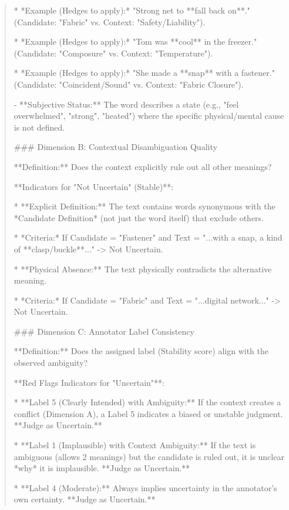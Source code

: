 \begin{quote}
    *   *Example (Hedges to apply):* "Strong net to **fall back on**." (Candidate: "Fabric" vs. Context: "Safety/Liability").

    *   *Example (Hedges to apply):* "Tom was **cool** in the freezer." (Candidate: "Composure" vs. Context: "Temperature").

    *   *Example (Hedges to apply):* "She made a **snap** with a fastener." (Candidate: "Coincident/Sound" vs. Context: "Fabric Closure").

- **Subjective Status:** The word describes a state (e.g., "feel overwhelmed", "strong", "heated") where the specific physical/mental cause is not defined.



### Dimension B: Contextual Disambiguation Quality

**Definition:** Does the context explicitly rule out all other meanings?

**Indicators for "Not Uncertain" (Stable)**:

*   **Explicit Definition:** The text contains words synonymous with the *Candidate Definition* (not just the word itself) that exclude others.

    *   *Criteria:* If Candidate = "Fastener" and Text = "...with a snap, a kind of **clasp/buckle**..." -> Not Uncertain.

*   **Physical Absence:** The text physically contradicts the alternative meaning.

    *   *Criteria:* If Candidate = "Fabric" and Text = "...digital network..." -> Not Uncertain.



### Dimension C: Annotator Label Consistency

**Definition:** Does the assigned label (Stability score) align with the observed ambiguity?

**Red Flags Indicators for "Uncertain"**:

*   **Label 5 (Clearly Intended) with Ambiguity:** If the context creates a conflict (Dimension A), a Label 5 indicates a biased or unstable judgment. **Judge as Uncertain.**

*   **Label 1 (Implausible) with Context Ambiguity:** If the text is ambiguous (allows 2 meanings) but the candidate is ruled out, it is unclear *why* it is implausible. **Judge as Uncertain.**

*   **Label 4 (Moderate):** Always implies uncertainty in the annotator's own certainty. **Judge as Uncertain.**


\end{quote}
